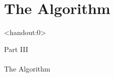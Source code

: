 \documentclass[xcolor=svgnames,aspectratio=32,8pt]{beamer}
\begin{document}
\begin{frame}
\begin{changemargin}{-0.9cm}{-0.9cm}
\end{changemargin}
\end{frame}


\section
  {The Algorithm}

\begin{frame}<handout:0>
  {}{}
  \begin{changemargin}{-1cm}{-1cm}
  \centering
  {\Huge \color{evolvdso} Part III\\\ \\The Algorithm}
  \end{changemargin}
\end{frame}
\end{document}
